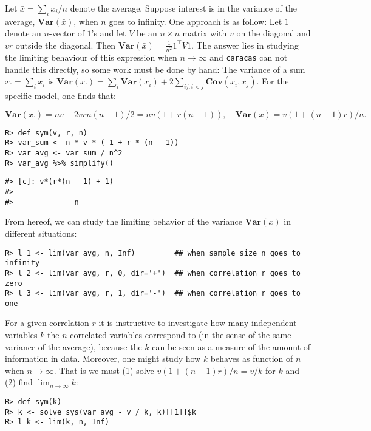 Let \(\bar x = \sum_i x_i / n\) denote the average. Suppose interest is
in the variance of the average, \(\mathbf{Var}(\bar x)\), when \(n\) goes to
infinity. One approach is as follow: Let \(1\) denote an \(n\)-vector of
\(1\)'s and let \(V\) be an \(n \times n\) matrix with \(v\) on the diagonal
and \(v r\) outside the diagonal. Then \(\mathbf{Var}(\bar x)=\frac 1 {n^2} 1^\top V 1\). The answer lies in studying the limiting behaviour of
this expression when \(n \rightarrow \infty\) and \texttt{caracas} can not
handle this directly, so some work must be done by hand: The variance of a sum \(x. = \sum_i x_i\)
is \(\mathbf{Var}(x.) = \sum_i \mathbf{Var}(x_i) + 2 \sum_{ij:i<j} \mathbf{Cov}(x_i, x_j)\). For the specific model, one finds that:

\[
\mathbf{Var}(x.) = n v + 2 v r n (n-1) / 2 = n v (1 + r (n-1)),
\quad
  \mathbf{Var}(\bar x) = v (1 + (n-1)r)/n.
\]

\begin{verbatim}
R> def_sym(v, r, n) 
R> var_sum <- n * v * ( 1 + r * (n - 1)) 
R> var_avg <- var_sum / n^2
R> var_avg %>% simplify()
\end{verbatim}

\begin{verbatim}
#> [c]: v*(r*(n - 1) + 1)
#>      -----------------
#>              n
\end{verbatim}

From hereof, we can study the limiting behavior of the variance
\(\mathbf{Var}(\bar x)\) in different situations:

\begin{verbatim}
R> l_1 <- lim(var_avg, n, Inf)         ## when sample size n goes to infinity
R> l_2 <- lim(var_avg, r, 0, dir='+')  ## when correlation r goes to zero
R> l_3 <- lim(var_avg, r, 1, dir='-')  ## when correlation r goes to one
\end{verbatim}

For a given correlation \(r\) it is instructive to investigate how many
independent variables \(k\) the \(n\) correlated variables correspond to
(in the sense of the same variance of the average), because the \(k\)
can be seen as a measure of the amount of information in data.
Moreover, one might study how \(k\) behaves as function of \(n\)
when \(n \rightarrow \infty\).
That is we must (1) solve \(v (1 + (n-1)r)/n = v/k\) for \(k\)
and (2) find \(\lim_{n\rightarrow\infty} k\):

\begin{verbatim}
R> def_sym(k)
R> k <- solve_sys(var_avg - v / k, k)[[1]]$k
R> l_k <- lim(k, n, Inf)
\end{verbatim}

